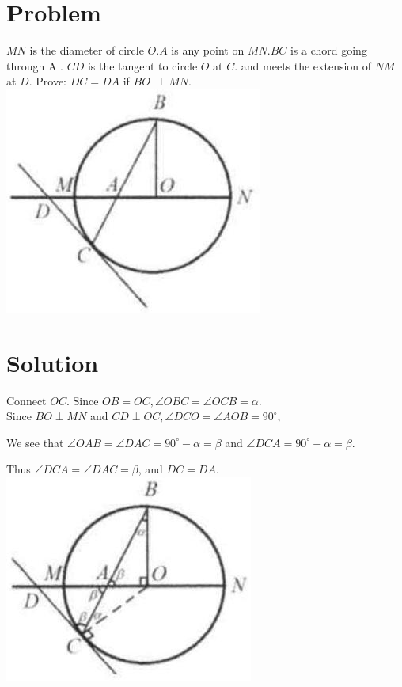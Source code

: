 \documentclass{article}
\begin{document}
\section*{Problem}
\(M N\) is the diameter of circle \(O . A\) is any point on \(M N . B C\) is a chord going through A . \(C D\) is the tangent to circle \(O\) at \(C\). and meets the extension of \(N M\) at \(D\). Prove: \(D C=D A\) if \(B O\) \(\perp M N\).\\
\centering
\includegraphics[width=\textwidth]{images/154(3).jpg}

\section*{Solution}
Connect \(O C\). Since \(O B=O C, \angle O B C=\angle O C B=\alpha\).\\
Since \(B O \perp M N\) and \(C D \perp O C, \angle D C O=\angle A O B=90^{\circ}\),

We see that \(\angle O A B=\angle D A C=90^{\circ}-\alpha=\beta\) and \(\angle D C A=90^{\circ}-\alpha=\beta\).

Thus \(\angle D C A=\angle D A C=\beta\), and \(D C=D A\).\\
\centering
\includegraphics[width=\textwidth]{images/157(1).jpg}
\end{document}
